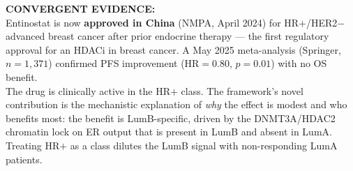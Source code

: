\documentclass[12pt, a4paper]{article}
\begin{document}
\vspace{0.8em}

\begin{center}
\colorbox{convergentbox}{
\begin{minipage}{0.88\textwidth}
\vspace{0.5em}
\textbf{CONVERGENT EVIDENCE:}\\[0.3em]
Entinostat is now \textbf{approved in China}
(NMPA, April 2024) for HR$+$/HER2$-$ advanced
breast cancer after prior endocrine therapy ---
the first regulatory approval for an HDACi in
breast cancer. A May 2025 meta-analysis
(Springer, $n=1{,}371$) confirmed PFS improvement
(HR$=0.80$, $p=0.01$) with no OS benefit.\\[0.3em]
The drug is clinically active in the HR$+$ class.
The framework's novel contribution is the
mechanistic explanation of \textit{why} the effect
is modest and who benefits most: the benefit is
LumB-specific, driven by the DNMT3A/HDAC2
chromatin lock on ER output that is present in
LumB and absent in LumA. Treating HR$+$ as a
class dilutes the LumB signal with non-responding
LumA patients.
\vspace{0.5em}
\end{minipage}}
\end{center}

\vspace{0.8em}
\end{document}
